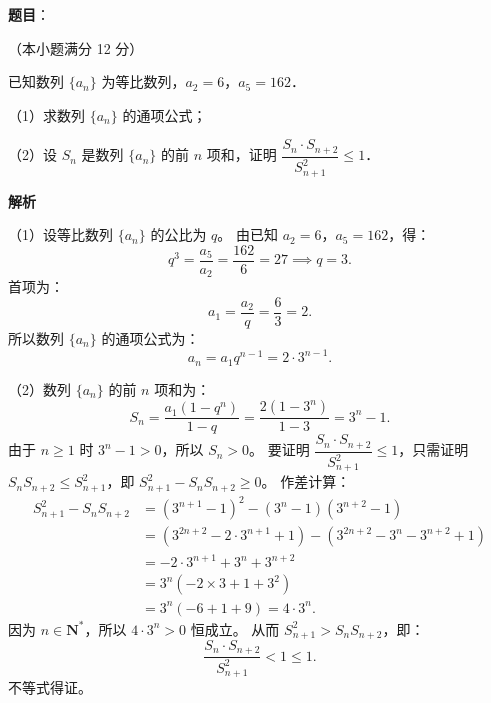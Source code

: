 \begin{answer}

\textbf{题目}：

（本小题满分 12 分）

已知数列 $\{a_n\}$ 为等比数列，$a_2=6$，$a_5=162$．

（1）求数列 $\{a_n\}$ 的通项公式；

（2）设 $S_n$ 是数列 $\{a_n\}$ 的前 $n$ 项和，证明 $\dfrac{S_n\cdot S_{n+2}}{S_{n+1}^2}\leqslant 1$．

\textbf{解析}

（1）设等比数列 $\{a_n\}$ 的公比为 $q$。
由已知 $a_2=6$，$a_5=162$，得：
\nopagebreak[4]
\[
q^3=\frac{a_5}{a_2}=\frac{162}{6}=27\implies q=3.
\]
首项为：
\nopagebreak[4]
\[
a_1=\frac{a_2}{q}=\frac{6}{3}=2.
\]
所以数列 $\{a_n\}$ 的通项公式为：
\nopagebreak[4]
\[
a_n=a_1 q^{n-1}=2\cdot 3^{n-1}.
\]

（2）数列 $\{a_n\}$ 的前 $n$ 项和为：
\nopagebreak[4]
\[
S_n=\frac{a_1(1-q^n)}{1-q}=\frac{2(1-3^n)}{1-3}=3^n-1.
\]
由于 $n\geqslant 1$ 时 $3^n-1>0$，所以 $S_n>0$。
要证明 $\dfrac{S_n\cdot S_{n+2}}{S_{n+1}^2}\leqslant 1$，只需证明 $S_n S_{n+2}\leqslant S_{n+1}^2$，即 $S_{n+1}^2-S_n S_{n+2}\geqslant 0$。
作差计算：
\nopagebreak[4]
\[
\begin{aligned}
S_{n+1}^2-S_n S_{n+2}&=(3^{n+1}-1)^2-(3^n-1)(3^{n+2}-1)\\
&=(3^{2n+2}-2\cdot 3^{n+1}+1)-(3^{2n+2}-3^n-3^{n+2}+1)\\
&=-2\cdot 3^{n+1}+3^n+3^{n+2}\\
&=3^n(-2\times 3+1+3^2)\\
&=3^n(-6+1+9)=4\cdot 3^n.
\end{aligned}
\]
因为 $n\in\mathbf{N}^*$，所以 $4\cdot 3^n>0$ 恒成立。
从而 $S_{n+1}^2>S_n S_{n+2}$，即：
\nopagebreak[4]
\[
\frac{S_n\cdot S_{n+2}}{S_{n+1}^2}<1\leqslant 1.
\]
不等式得证。


\end{answer}
